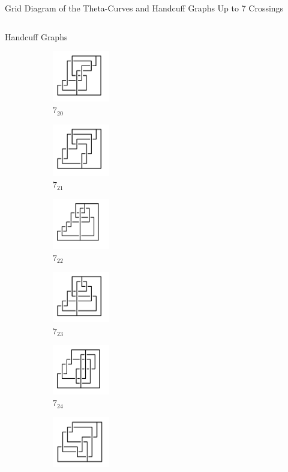 \documentclass[final]{beamer}
\begin{document}
\begin{frame}[t]
\begin{alertblock}{Grid Diagram of the Theta-Curves and Handcuff Graphs Up to 7 Crossings}
\begin{columns}[t]
\begin{column}{0.3\textwidth}
\begin{alertblock}{Handcuff Graphs}
\begin{figure}
\begin{subfigure}{0.15\textwidth}
    \includegraphics[width=2.5cm]{../Midterm_Poster/grid_diagram/handcuff_7_20.png}
    \caption{$7_{20}$} 
    \end{subfigure}
    \begin{subfigure}{0.15\textwidth}
    \includegraphics[width=2.5cm]{../Midterm_Poster/grid_diagram/handcuff_7_21.png}
    \caption{$7_{21}$} 
    \end{subfigure}
    \begin{subfigure}{0.15\textwidth}
    \includegraphics[width=2.5cm]{../Midterm_Poster/grid_diagram/handcuff_7_22.png}
    \caption{$7_{22}$} 
    \end{subfigure}
    \begin{subfigure}{0.15\textwidth}
    \includegraphics[width=2.5cm]{../Midterm_Poster/grid_diagram/handcuff_7_23.png}
    \caption{$7_{23}$} 
    \end{subfigure}
    \begin{subfigure}{0.15\textwidth}
    \includegraphics[width=2.5cm]{../Midterm_Poster/grid_diagram/handcuff_7_24.png}
    \caption{$7_{24}$} 
    \end{subfigure}
    \begin{subfigure}{0.15\textwidth}
    \includegraphics[width=2.5cm]{../Midterm_Poster/grid_diagram/handcuff_7_25.png}

\end{subfigure}
\end{figure}
\end{alertblock}
\end{column}
\end{columns}
\end{alertblock}
\end{frame}
\end{document}
